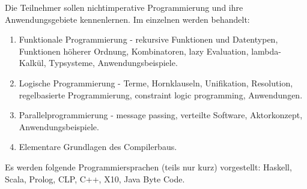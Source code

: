 \begin{module}
\begin{content}
Die Teilnehmer sollen nichtimperative Programmierung und ihre Anwendungsgebiete kennenlernen. Im einzelnen werden behandelt:

 \begin{enumerate}\item Funktionale Programmierung - rekursive Funktionen und Datentypen, Funktionen höherer Ordnung, Kombinatoren, lazy Evaluation, lambda-Kalkül, Typsysteme, Anwendungsbeispiele.  \item Logische Programmierung - Terme, Hornklauseln, Unifikation, Resolution, regelbasierte Programmierung, constraint logic programming, Anwendungen.  \item Parallelprogrammierung - message passing, verteilte Software, Aktorkonzept, Anwendungsbeispiele.  \item Elementare Grundlagen des Compilerbaus.  \end{enumerate}

Es werden folgende Programmiersprachen (teils nur kurz) vorgestellt: Haskell, Scala, Prolog, CLP, C++, X10, Java Byte Code.


\end{content}



\end{module}

